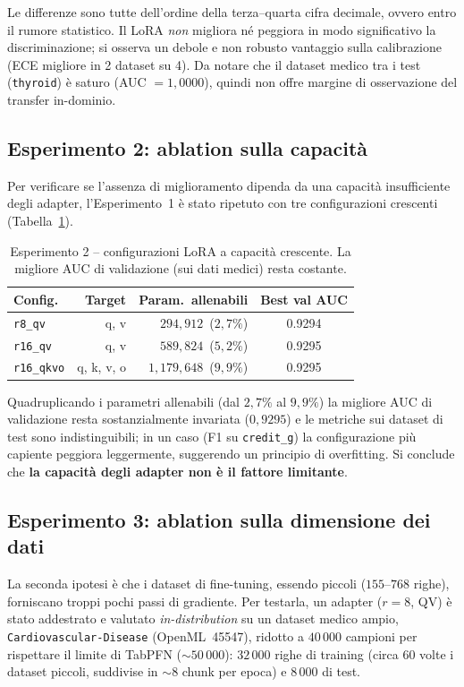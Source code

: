 \documentclass[11pt,a4paper]{article}
\begin{document}
Le differenze sono tutte dell'ordine della terza--quarta cifra decimale, ovvero
entro il rumore statistico. Il LoRA \emph{non} migliora né peggiora in modo
significativo la discriminazione; si osserva un debole e non robusto vantaggio
sulla calibrazione (ECE migliore in 2 dataset su 4). Da notare che il dataset
medico tra i test (\texttt{thyroid}) è saturo (AUC $=1{,}0000$), quindi non offre
margine di osservazione del transfer in-dominio.

\subsection{Esperimento 2: ablation sulla capacità}
\label{sec:capacity}
Per verificare se l'assenza di miglioramento dipenda da una capacità
insufficiente degli adapter, l'Esperimento~1 è stato ripetuto con tre
configurazioni crescenti (Tabella~\ref{tab:capacity}).

\begin{table}[h]
\centering
\caption{Esperimento 2 -- configurazioni LoRA a capacità crescente. La migliore
AUC di validazione (sui dati medici) resta costante.}
\label{tab:capacity}
\small
\begin{tabular}{lrrc}
\toprule
Config. & Target & Param.\ allenabili & Best val AUC \\
\midrule
\texttt{r8\_qv}    & q, v       & $294{,}912$\ ($2{,}7\%$)  & 0.9294 \\
\texttt{r16\_qv}   & q, v       & $589{,}824$\ ($5{,}2\%$)  & 0.9295 \\
\texttt{r16\_qkvo} & q, k, v, o & $1{,}179{,}648$\ ($9{,}9\%$) & 0.9295 \\
\bottomrule
\end{tabular}
\end{table}

Quadruplicando i parametri allenabili (dal $2{,}7\%$ al $9{,}9\%$) la migliore
AUC di validazione resta sostanzialmente invariata ($0{,}9295$) e le metriche sui
dataset di test sono indistinguibili; in un caso (F1 su \texttt{credit\_g}) la
configurazione più capiente peggiora leggermente, suggerendo un principio di
overfitting. Si conclude che \textbf{la capacità degli adapter non è il fattore
limitante}.

\subsection{Esperimento 3: ablation sulla dimensione dei dati}
\label{sec:datasize}
La seconda ipotesi è che i dataset di fine-tuning, essendo piccoli
($155$--$768$ righe), forniscano troppi pochi passi di gradiente. Per testarla,
un adapter ($r=8$, QV) è stato addestrato e valutato \emph{in-distribution} su un
dataset medico ampio, \texttt{Cardiovascular-Disease} (OpenML~45547), ridotto a
$40\,000$ campioni per rispettare il limite di TabPFN ($\sim$$50\,000$):
$32\,000$ righe di training (circa $60$ volte i dataset piccoli, suddivise in
$\sim$$8$ chunk per epoca) e $8\,000$ di test.
\end{document}
